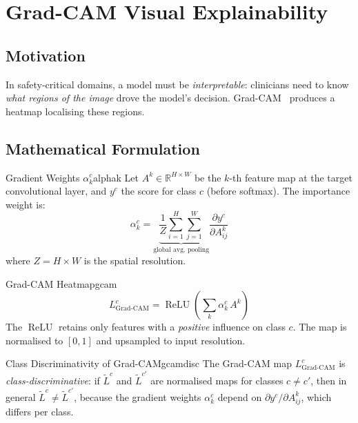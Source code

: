 \documentclass[12pt,a4paper]{article}
\newcommand{\ReLU}{\operatorname{ReLU}}
\newcommand{\R}{\mathbb{R}}
\begin{document}
\section{Grad-CAM Visual Explainability}

\subsection{Motivation}

In safety-critical domains, a model must be \emph{interpretable}: clinicians need to
know \emph{what regions of the image} drove the model's decision.
Grad-CAM~\cite{gradcam} produces a heatmap localising these regions.

\subsection{Mathematical Formulation}

\begin{definition}{Gradient Weights $\alpha_k^c$}{alphak}
Let $A^k \in \R^{H \times W}$ be the $k$-th feature map at the target convolutional
layer, and $y^c$ the score for class $c$ (before softmax). The importance weight is:
\[
  \alpha_k^c
  = \underbrace{\frac{1}{Z}\sum_{i=1}^H\sum_{j=1}^W}_{\text{global avg.\ pooling}}
    \frac{\partial y^c}{\partial A_{ij}^k}
\]
where $Z = H \times W$ is the spatial resolution.
\end{definition}

\begin{definition}{Grad-CAM Heatmap}{gcam}
\[
  L^c_{\text{Grad-CAM}}
  = \ReLU\!\left(\sum_k \alpha_k^c\, A^k\right)
\]
The $\ReLU$ retains only features with a \emph{positive} influence on class $c$.
The map is normalised to $[0,1]$ and upsampled to input resolution.
\end{definition}

\begin{theorem}{Class Discriminativity of Grad-CAM}{gcamdisc}
The Grad-CAM map $L^c_{\text{Grad-CAM}}$ is \emph{class-discriminative}:
if $\tilde{L}^{c}$ and $\tilde{L}^{c'}$ are normalised maps for classes $c \neq c'$,
then in general $\tilde{L}^{c} \neq \tilde{L}^{c'}$, because the gradient weights
$\alpha_k^c$ depend on $\partial y^c/\partial A_{ij}^k$, which differs per class.
\end{theorem}
\end{document}
